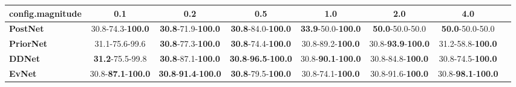 \begin{tabular}{lccccccc}
\toprule
\textbf{config.magnitude} &                                0.1 &                                         0.2 &                                         0.5 &                                1.0 &                                2.0 &                                4.0 \\
\midrule
\textbf{PostNet } &           30.8-74.3-\textbf{100.0} &           \textbf{30.8}-71.9-\textbf{100.0} &           \textbf{30.8}-84.0-\textbf{100.0} &  \textbf{33.9}-50.0-\textbf{100.0} &            \textbf{50.0}-50.0-50.0 &            \textbf{50.0}-50.0-50.0 \\
\textbf{PriorNet} &                     31.1-75.6-99.6 &           \textbf{30.8}-77.3-\textbf{100.0} &           \textbf{30.8}-74.4-\textbf{100.0} &           30.8-89.2-\textbf{100.0} &  30.8-\textbf{93.9}-\textbf{100.0} &           31.2-58.8-\textbf{100.0} \\
\textbf{DDNet   } &            \textbf{31.2}-75.5-99.8 &           \textbf{30.8}-87.1-\textbf{100.0} &  \textbf{30.8}-\textbf{96.5}-\textbf{100.0} &  30.8-\textbf{90.1}-\textbf{100.0} &           30.8-84.8-\textbf{100.0} &           30.8-74.5-\textbf{100.0} \\
\textbf{EvNet   } &  30.8-\textbf{87.1}-\textbf{100.0} &  \textbf{30.8}-\textbf{91.4}-\textbf{100.0} &           \textbf{30.8}-79.5-\textbf{100.0} &           30.8-74.1-\textbf{100.0} &           30.8-91.6-\textbf{100.0} &  30.8-\textbf{98.1}-\textbf{100.0} \\
\bottomrule
\end{tabular}
